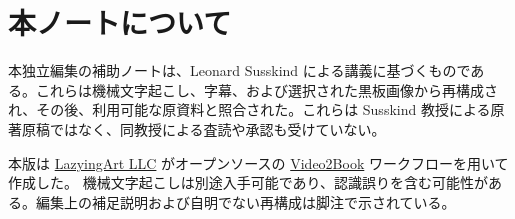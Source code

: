 \documentclass[11pt,oneside]{book}
\begin{document}
\frontmatter
\hypersetup{pageanchor=false}

\hypersetup{pageanchor=true}

\clearpage
\chapter*{本ノートについて}
本独立編集の補助ノートは、Leonard Susskind による講義に基づくものである。これらは機械文字起こし、字幕、および選択された黒板画像から再構成され、その後、利用可能な原資料と照合された。これらは Susskind 教授による原著原稿ではなく、同教授による査読や承認も受けていない。

本版は \href{https://lazying.art}{LazyingArt LLC} がオープンソースの
\href{https://github.com/lachlanchen/Video2Book}{Video2Book} ワークフローを用いて作成した。
機械文字起こしは別途入手可能であり、認識誤りを含む可能性がある。編集上の補足説明および自明でない再構成は脚注で示されている。
\clearpage
\tableofcontents
\mainmatter
\graphicspath{{../../../generated_course_notes/supplementary/higgs_boson/2012_summer/chapters/lecture_01/}{../../../generated_course_notes/supplementary/higgs_boson/2012_summer/figures/}{../../../generated_course_notes/supplementary/higgs_boson/2012_summer/assets/}}

\end{document}
